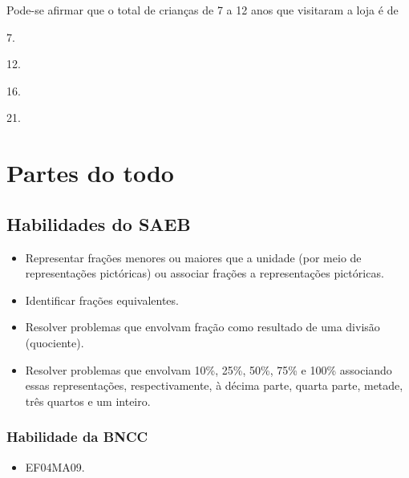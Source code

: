 Pode-se afirmar que o total de crianças
de 7 a 12 anos que visitaram a loja é de

\begin{escolha}
\item
  7.
\item
  12.
\item
  16.
\item
  21.
\end{escolha}


\chapter{Partes do todo}

\section{Habilidades do SAEB}

\begin{itemize}
\item Representar frações menores ou maiores que a unidade (por meio de
representações pictóricas) ou associar frações a representações pictóricas.

\item Identificar frações equivalentes.

\item Resolver problemas que envolvam fração como resultado de uma divisão
(quociente).

\item Resolver problemas que envolvam 10\%, 25\%, 50\%, 75\% e 100\%
associando essas representações, respectivamente, à décima parte, quarta parte, metade,
três quartos e um inteiro.
\end{itemize}

\subsection{Habilidade da BNCC}

\begin{itemize}
\item EF04MA09.
\end{itemize}

